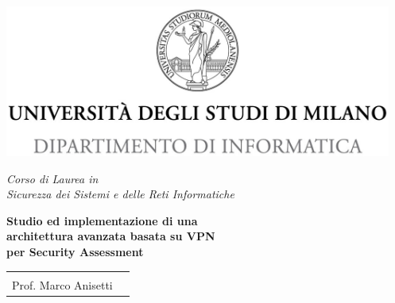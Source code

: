 \documentclass[12pt,fleqn,twoside,a4paper]{book}
\begin{document}

\begin{titlepage}
  \begin{center}
    \includegraphics[height=5.0cm]{img/minerva_2013_DI.jpg}

    \vspace*{.4cm}
    {\Large
      \emph{Corso di Laurea in\\[.3cm]
        Sicurezza dei Sistemi e delle Reti Informatiche}
    }
    \vfill
    \begin{LARGE}


      \textbf{Studio ed implementazione di una\\[0.2cm] %
        architettura avanzata basata su VPN\\[0.2cm] %
        per Security Assessment}
    \end{LARGE}

    \vfill
    \begin{minipage}{.99\linewidth}
      \begin{tabular}{l r}
        \begin{minipage}{.4\linewidth}
          \begin{flushleft}
            {\large
              RELATORE\\[.3cm]
              Prof. Marco Anisetti
            }


\end{flushleft}
\end{minipage}
\end{tabular}
\end{minipage}
\end{center}
\end{titlepage}
\end{document}
